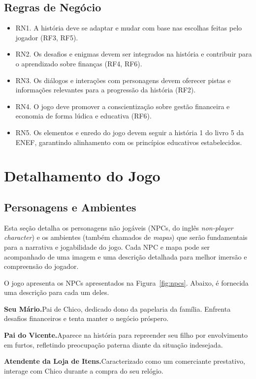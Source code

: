 \subsection*{Regras de Negócio}
\begin{itemize}
	\item RN1. A história deve se adaptar e mudar com base nas escolhas feitas pelo jogador (RF3, RF5).
	\item RN2. Os desafios e enigmas devem ser integrados na história e contribuir para o aprendizado sobre finanças (RF4, RF6).
	\item RN3. Os diálogos e interações com personagens devem oferecer pistas e informações relevantes para a progressão da história (RF2).
	\item RN4. O jogo deve promover a conscientização sobre gestão financeira e economia de forma lúdica e educativa (RF6).
	\item RN5. Os elementos e enredo do jogo devem seguir a história 1 do livro 5 da ENEF, garantindo alinhamento com os princípios educativos estabelecidos.
\end{itemize}

\section{Detalhamento do Jogo}

\subsection{Personagens e Ambientes}
Esta seção detalha os personagens não jogáveis (NPCs, do inglês \textit{non-player character}) e os ambientes (também chamados de \textit{mapas}) que serão fundamentais para a narrativa e jogabilidade do jogo. Cada NPC e mapa pode ser acompanhado de uma imagem e uma descrição detalhada para melhor imersão e compreensão do jogador.

O jogo apresenta os NPCs apresentados na Figura~\ref{fig:npcs}. Abaixo, é fornecida uma descrição para cada um deles.

\medskip\noindent \textbf{Seu Mário.}\quad Pai de Chico, dedicado dono da papelaria da família. Enfrenta desafios financeiros e tenta manter o negócio próspero.

\medskip\noindent \textbf{Pai do Vicente.}\quad Aparece na história para repreender seu filho por envolvimento em furtos, refletindo preocupação paterna diante da situação indesejada.

\medskip\noindent \textbf{Atendente da Loja de Itens.}\quad Caracterizado como um comerciante prestativo, interage com Chico durante a compra do seu relógio.

